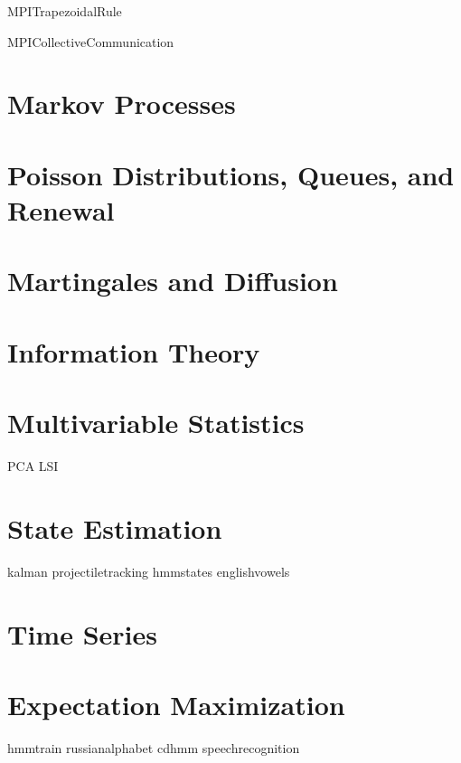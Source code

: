 \documentclass[nociteref]{newsiambook}
\begin{document}
{MPITrapezoidalRule}




{MPICollectiveCommunication}


\part{Markov Processes}

\part{Poisson Distributions, Queues, and Renewal}

\part{Martingales and Diffusion}

\part{Information Theory}

\part{Multivariable Statistics}
{PCA}
{LSI}

\part{State Estimation}
{kalman}
{projectiletracking}
{hmmstates}
{englishvowels}

\part{Time Series}

\part{Expectation Maximization}
{hmmtrain}
{russianalphabet}
{cdhmm}
{speechrecognition}
\end{document}
